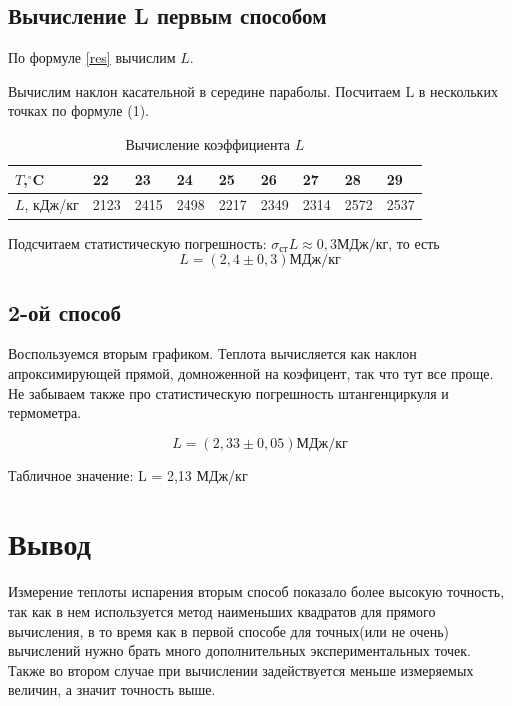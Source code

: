 \documentclass[a4paper,12pt]{article}
\begin{document}
\subsection{Вычисление L первым способом}

По формуле \eqref{res} вычислим $L$.

Вычислим наклон касательной в середине параболы. Посчитаем L в нескольких точках по формуле (1).
\begin{table}[h!] 
	\caption{Вычисление коэффициента $L$}
	\begin{center}
		\begin{tabular}{|*{9}{l|}}
			\hline 
		
				$T$,$^{\circ}$C & 22&	23&	24&	25&26& 27 &28 &29 \\ \hline
				$L$, кДж/кг& 2123 & 2415 & 2498 & 2217& 2349 & 2314& 2572 & 2537 \\ \hline
				
		\end{tabular}
		
	\end{center}
\end{table}

Подсчитаем статистическую погрешность: $  \sigma _{ст}L\approx 0,3 МДж/кг$, то есть  
$$L = (2,4 \pm 0,3) МДж  / кг$$

\newpage
\subsection{2-ой способ} Воспользуемся вторым графиком. Теплота вычисляется как наклон апроксимирующей прямой, домноженной на коэфицент, так что тут все проще. Не забываем также про статистическую погрешность штангенциркуля и термометра.  

$$
L =( 2,33 \pm 0,05) МДж/кг 
$$

Табличное значение: L = 2,13 МДж/кг

\section{Вывод}


Измерение теплоты испарения вторым способ показало более высокую точность, так как в нем используется метод наименьших квадратов для прямого вычисления, в то время как в первой способе для точных(или не очень) вычислений нужно брать много дополнительных экспериментальных точек. Также во втором случае при вычислении задействуется меньше измеряемых величин, а значит точность выше.
\end{document}
